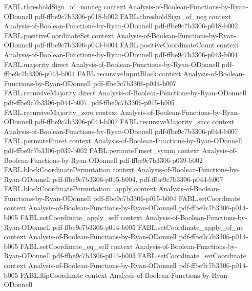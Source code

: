\begin{theorem}
\proofstep
  {FABL.thresholdSign_of_nonneg}
  {context}
  {Analysis-of-Boolean-Functions-by-Ryan-ODonnell}
  {pdf-ffbe9c7b3306-p018-b002}
\proofstep
  {FABL.thresholdSign_of_neg}
  {context}
  {Analysis-of-Boolean-Functions-by-Ryan-ODonnell}
  {pdf-ffbe9c7b3306-p018-b002}
\proofstep
  {FABL.positiveCoordinateSet}
  {context}
  {Analysis-of-Boolean-Functions-by-Ryan-ODonnell}
  {pdf-ffbe9c7b3306-p043-b004}
\proofstep
  {FABL.positiveCoordinateCount}
  {context}
  {Analysis-of-Boolean-Functions-by-Ryan-ODonnell}
  {pdf-ffbe9c7b3306-p043-b004}
\proofstep
  {FABL.majority}
  {direct}
  {Analysis-of-Boolean-Functions-by-Ryan-ODonnell}
  {pdf-ffbe9c7b3306-p043-b004}
\proofstep
  {FABL.recursiveInputBlock}
  {context}
  {Analysis-of-Boolean-Functions-by-Ryan-ODonnell}
  {pdf-ffbe9c7b3306-p044-b007}
\proofstep
  {FABL.recursiveMajority}
  {direct}
  {Analysis-of-Boolean-Functions-by-Ryan-ODonnell}
  {pdf-ffbe9c7b3306-p044-b007,
    pdf-ffbe9c7b3306-p015-b005}
\proofstep
  {FABL.recursiveMajority_zero}
  {context}
  {Analysis-of-Boolean-Functions-by-Ryan-ODonnell}
  {pdf-ffbe9c7b3306-p044-b007}
\proofstep
  {FABL.recursiveMajority_succ}
  {context}
  {Analysis-of-Boolean-Functions-by-Ryan-ODonnell}
  {pdf-ffbe9c7b3306-p044-b007}
\proofstep
  {FABL.permuteFinset}
  {context}
  {Analysis-of-Boolean-Functions-by-Ryan-ODonnell}
  {pdf-ffbe9c7b3306-p039-b002}
\proofstep
  {FABL.permuteFinset_symm}
  {context}
  {Analysis-of-Boolean-Functions-by-Ryan-ODonnell}
  {pdf-ffbe9c7b3306-p039-b002}
\proofstep
  {FABL.blockCoordinatePermutation}
  {context}
  {Analysis-of-Boolean-Functions-by-Ryan-ODonnell}
  {pdf-ffbe9c7b3306-p015-b004,
    pdf-ffbe9c7b3306-p044-b007}
\proofstep
  {FABL.blockCoordinatePermutation_apply}
  {context}
  {Analysis-of-Boolean-Functions-by-Ryan-ODonnell}
  {pdf-ffbe9c7b3306-p015-b004}
\proofstep
  {FABL.setCoordinate}
  {context}
  {Analysis-of-Boolean-Functions-by-Ryan-ODonnell}
  {pdf-ffbe9c7b3306-p014-b005}
\proofstep
  {FABL.setCoordinate_apply_self}
  {context}
  {Analysis-of-Boolean-Functions-by-Ryan-ODonnell}
  {pdf-ffbe9c7b3306-p014-b005}
\proofstep
  {FABL.setCoordinate_apply_of_ne}
  {context}
  {Analysis-of-Boolean-Functions-by-Ryan-ODonnell}
  {pdf-ffbe9c7b3306-p014-b005}
\proofstep
  {FABL.setCoordinate_eq_self}
  {context}
  {Analysis-of-Boolean-Functions-by-Ryan-ODonnell}
  {pdf-ffbe9c7b3306-p014-b005}
\proofstep
  {FABL.setCoordinate_setCoordinate}
  {context}
  {Analysis-of-Boolean-Functions-by-Ryan-ODonnell}
  {pdf-ffbe9c7b3306-p014-b005}
\proofstep
  {FABL.flipCoordinate}
  {context}
  {Analysis-of-Boolean-Functions-by-Ryan-ODonnell}

\end{theorem}
